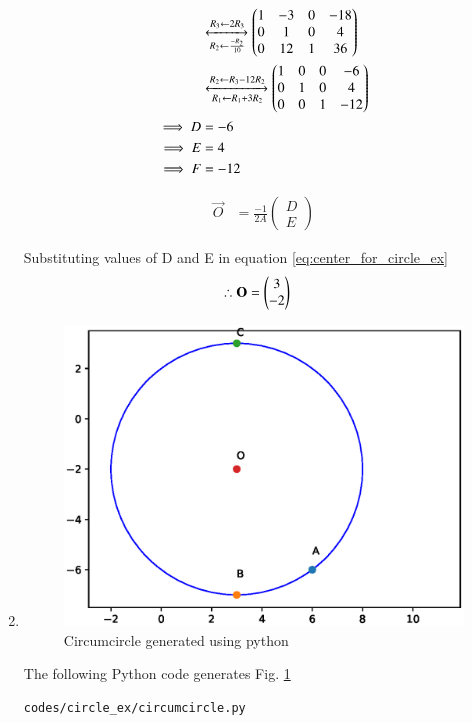\begin{enumerate}[label=\thesubsection.\arabic*.,ref=\thesubsection.\theenumi]
\begin{align}
&\xleftrightarrow[R_2 \leftarrow \frac{-R_2}{10}]{R_3 \leftarrow 2R_3}
\begin{pmatrix}1 & -3 & 0 & -18 \\
0 & 1 & 0 & 4 \\
0 & 12 & 1 & 36
\end{pmatrix}\\
&\xleftrightarrow[R_1 \leftarrow R_1 + 3R_2]{R_2 \leftarrow R_3 - 12 R_2}
\begin{pmatrix}1 & 0 & 0 & -6 \\
0 & 1 & 0 & 4 \\
0 & 0 & 1 & -12
\end{pmatrix}\\
\implies D &= -6\\
\implies E &= 4\\
\implies F &= -12
\end{align}

\begin{align}
\vec{O} &= \frac{-1}{2A}\begin{pmatrix}
D \\ E 
\end{pmatrix}\label{eq:center_for_circle_ex}
\end{align}

Substituting values of D and E in equation \ref{eq:center_for_circle_ex}
\begin{align}
\therefore \mathbf{O} &= \begin{pmatrix}3\\-2\end{pmatrix}
\end{align}

\item \begin{figure}[!ht]
\centering
\includegraphics[width=\columnwidth]{./figs/circle_ex/circumcircle.eps}
\caption{Circumcircle generated using python}
\label{fig:Circumcircle2_circle_ex}
\end{figure} 

The following Python code generates Fig. \ref{fig:Circumcircle2_circle_ex}

\begin{lstlisting}
codes/circle_ex/circumcircle.py
\end{lstlisting}
\end{enumerate}



